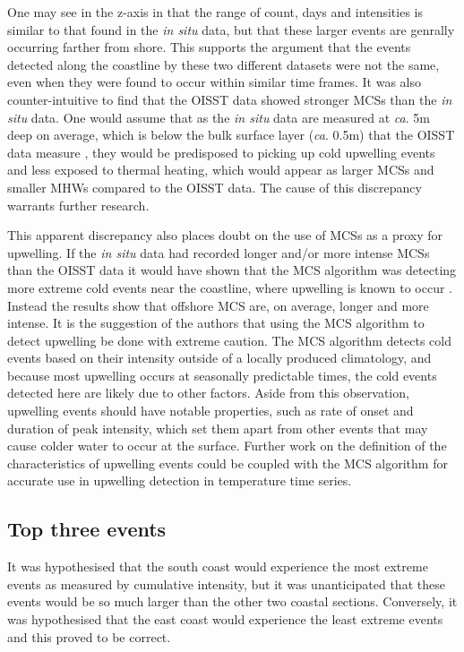 \documentclass[a4paper,10pt,review]{elsarticle}
\begin{document}
One may see in the z-axis in  that the range of count, days and intensities is similar to that found in the \emph{in situ} data, but that these larger events are genrally occurring farther from shore. This supports the argument that the events detected along the coastline by these two different datasets were not the same, even when they were found to occur within similar time frames. It was also counter-intuitive to find that the OISST data showed stronger MCSs than the \emph{in situ} data. One would assume that as the \emph{in situ} data are measured at \emph{ca}. 5m deep on average, which is below the bulk surface layer (\emph{ca}. 0.5m) that the OISST data measure \citep{Reynolds2002}, they would be predisposed to picking up cold upwelling events and less exposed to thermal heating, which would appear as larger MCSs and smaller MHWs compared to the OISST data. The cause of this discrepancy warrants further research.

This apparent discrepancy also places doubt on the use of MCSs as a proxy for upwelling. If the \emph{in situ} data had recorded longer and/or more intense MCSs than the OISST data it would have shown that the MCS algorithm was detecting more extreme cold events near the coastline, where upwelling is known to occur \citep{Lutjeharms2000, Hutchings2009}. Instead the results show that offshore MCS are, on average, longer and more intense. It is the suggestion of the authors that using the MCS algorithm to detect upwelling be done with extreme caution. The MCS algorithm detects cold events based on their intensity outside of a locally produced climatology, and because most upwelling occurs at seasonally predictable times, the cold events detected here are likely due to other factors. Aside from this observation, upwelling events should have notable properties, such as rate of onset and duration of peak intensity, which set them apart from other events that may cause colder water to occur at the surface. Further work on the definition of the characteristics of upwelling events could be coupled with the MCS algorithm for accurate use in upwelling detection in temperature time series.

\subsection{Top three events}
It was hypothesised that the south coast would experience the most extreme events as measured by cumulative intensity, but it was unanticipated that these events would be so much larger than the other two coastal sections. Conversely, it was hypothesised that the east coast would experience the least extreme events and this proved to be correct.
\end{document}
